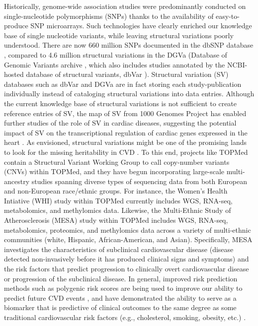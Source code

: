 \documentclass[letter]{bioinfo}
\begin{document}
	Historically, genome-wide association studies were predominantly conducted on single-nucleotide polymorphisms (SNPs) thanks to the availability of easy-to-produce SNP microarrays. Such technologies have clearly enriched our knowledge base of single nucleotide variants, while leaving structural variations poorly understood. There are now 660 million SNPs documented in the dbSNP database \citep{NCBI:2018:dbSNP}, compared to 4.6 million structural variations in the DGVa (Database of Genomic Variants archive \citep{EMBL-EBI:2018:Database}, which also includes studies annotated by the NCBI-hosted database of structural variants, dbVar \citep{NCBI:2018:dbVar}).  Structural variation (SV) databases such as dbVar and DGVa are in fact storing each study-publication individually instead of cataloging structural variations into data entries. Although the current knowledge base of structural variations is not sufficient to create reference entries of SV, the map of SV from 1000 Genomes Project \citep{Sudmant:2015:integrated} has enabled further studies of the role of SV in cardiac diseases, suggesting the potential impact of SV on the transcriptional regulation of cardiac genes expressed in the heart \citep{Haas:2018:Genomic}. As envisioned, structural variations might be one of the promising lands to look for the missing heritability in CVD \citep{Eichler:2010:Missing}.  To this end, projects like TOPMed contain a Structural Variant Working Group to call copy-number variants (CNVs) within TOPMed, and they have begun incorporating large-scale multi-ancestry studies spanning diverse types of sequencing data from both European and non-European race/ethnic groups.  For instance, the Women's Health Intiative (WHI) study \citep{NHLBI:1991:Women} within TOPMed currently includes WGS, RNA-seq, metabolomics, and methylomics data.  Likewise, the Multi-Ethnic Study of Atherosclerosis (MESA) study \citep{Bild:2002:MultiEthnic} within TOPMed includes WGS, RNA-seq, metabolomics, proteomics, and methylomics data across a variety of multi-ethnic communities (white, Hispanic, African-American, and Asian).  Specifically, MESA investigates the characteristics of subclinical cardiovascular disease (disease detected non-invasively before it has produced clinical signs and symptoms) and the risk factors that predict progression to clinically overt cardiovascular disease or progression of the subclinical disease.  In general, improved risk prediction methods such as polygenic risk scores are being used to improve our ability to predict future CVD events \citep{Goldstein:2014:Simple}, and have demonstrated the ability to serve as a biomarker that is predictive of clinical outcomes to the same degree as some traditional cardiovascular risk factors (e.g., cholesterol, smoking, obesity, etc.) \citep{deVries:2015:Incremental}. 
	
\end{document}
